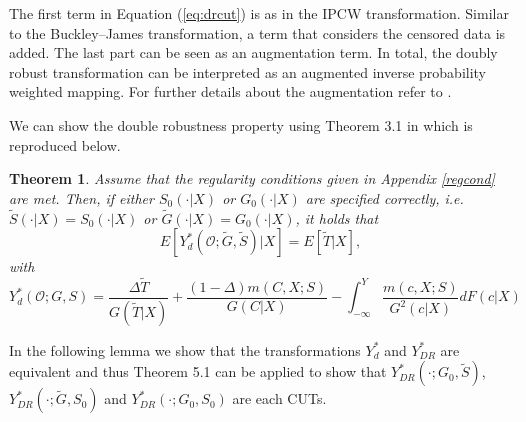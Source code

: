 \documentclass[12pt, a4paper]{scrartcl}
\theoremstyle{definition}
\theoremstyle{plain}
\newtheorem{Theorem}{Theorem}[section]
\numberwithin{equation}{section}
\numberwithin{figure}{section}
\numberwithin{table}{section}
\begin{document}
	The first term in Equation (\ref{eq:drcut}) is as in the IPCW transformation.
	Similar to the Buckley--James transformation, a term that considers the censored data is added.
	The last part can be seen as an augmentation term.
	In total, the doubly robust transformation can be interpreted as an augmented inverse probability weighted mapping.
	For further details about the augmentation refer to \citet*{bookfailuretime}.
		
	We can show the double robustness property using Theorem 3.1 in \citet*{drcut} which is reproduced below.
	
	\begin{Theorem}\label{thm:dr}
		Assume that the regularity conditions given in Appendix \ref{regcond} are met.
		Then, if either $S_0(\cdot\vert X)$ or $G_0(\cdot\vert X)$ are specified correctly, i.e. $\tilde{S}(\cdot\vert X)=S_0(\cdot\vert X)$ or $\tilde{G}(\cdot\vert X)=G_0(\cdot\vert X)$, it holds that
		\begin{equation*}
		E[Y_{d}^*(\mathcal{O};\tilde{G}, \tilde{S})\vert X] = E[\tilde T \vert X],
		\end{equation*}
		with 
		\begin{equation}\label{eq:drcut2}
		Y_d^*(\mathcal{O}; G,S) = \frac{\Delta \tilde T}{G(\tilde T\vert X)}+\frac{(1-\Delta)m(C,X;S)}{G(C \vert X)}-\int_{-\infty}^{Y}\frac{m(c,X;S)}{G^2(c\vert X)}dF(c\vert X)
		\end{equation}
	\end{Theorem}
	In the following lemma we show that the transformations $Y_d^*$ and $Y_{DR}^*$ are equivalent and thus Theorem 5.1 can be applied to show that $Y_{DR}^*(\cdot; G_0, \tilde{S})$, $Y_{DR}^*(\cdot; \tilde{G}, S_0)$ and $Y_{DR}^*(\cdot; G_0, S_0)$ are each CUTs.
	
\end{document}
